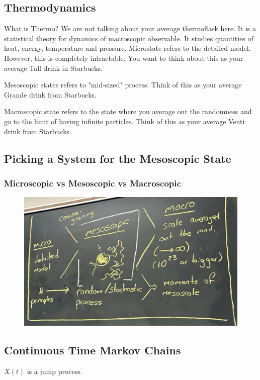 \subsection{Thermodynamics}

What is Thermo? We are not talking about your average thermoflask here. It is a statistical theory for dynamics of macroscopic observable. It studies quantities of heat, energy, temperature and pressure. Microstate refers to the detailed model. However, this is completely intractable. You want to think about this as your average Tall drink in Starbucks. 

Mesoscopic states refers to "mid-sized" process. Think of this as your average Grande drink from Starbucks. 

Macroscopic state refers to the state where you average out the randomness and go to the limit of having infinite particles. Think of this as your average Venti drink from Starbucks. 

\subsection{Picking a System for the Mesoscopic State}
\subsubsection{Microscopic vs Mesoscopic vs Macroscopic}
\begin{figure}[H]
    \centering
    \includegraphics[scale=0.152]{lectures/wk11/img/meso.jpeg}
    \label{fig:micro-meso-macro}
\end{figure}



\subsection{Continuous Time Markov Chains}
$X(t)$ is a jump process. 

